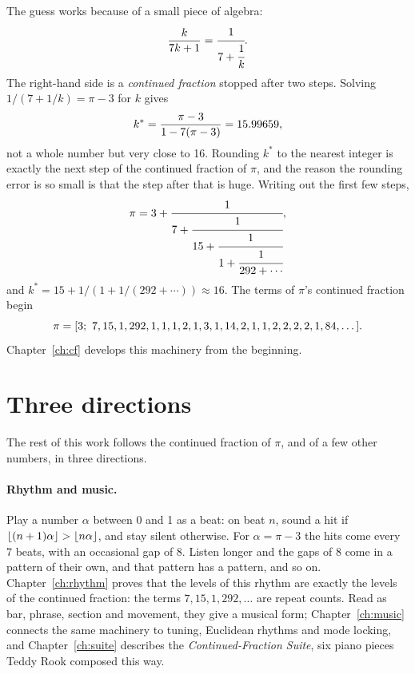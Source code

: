 The guess works because of a small piece of algebra:
\begin{equation}\label{eq:guess-cf}
  \frac{k}{7k+1} = \cfrac{1}{7 + \cfrac{1}{k}}.
\end{equation}
The right-hand side is a \emph{continued fraction} stopped after two steps. Solving $1/(7 + 1/k) = \pi - 3$ for $k$ gives
\[
  k^\ast = \frac{\pi - 3}{1 - 7(\pi-3)} = 15.99659,
\]
not a whole number but very close to 16. Rounding $k^\ast$ to the nearest integer is exactly the next step of the continued fraction of $\pi$, and the reason the rounding error is so small is that the step after that is huge. Writing out the first few steps,
\begin{equation}\label{eq:pi-cf}
  \pi = 3 + \cfrac{1}{7 + \cfrac{1}{15 + \cfrac{1}{1 + \cfrac{1}{292 + \cdots}}}},
\end{equation}
and $k^\ast = 15 + 1/(1 + 1/(292 + \cdots)) \approx 16$. The terms of $\pi$'s continued fraction begin
\[
  \pi = \cf{3;\ \PiTermsShown, \dots}.
\]
Chapter~\ref{ch:cf} develops this machinery from the beginning.

\section{Three directions}

The rest of this work follows the continued fraction of $\pi$, and of a few other numbers, in three directions.

\paragraph{Rhythm and music.} Play a number $\alpha$ between 0 and 1 as a beat: on beat $n$, sound a hit if $\left\lfloor (n+1)\alpha\right\rfloor > \left\lfloor n\alpha\right\rfloor$, and stay silent otherwise. For $\alpha = \pi - 3$ the hits come every 7 beats, with an occasional gap of 8. Listen longer and the gaps of 8 come in a pattern of their own, and that pattern has a pattern, and so on. Chapter~\ref{ch:rhythm} proves that the levels of this rhythm are exactly the levels of the continued fraction: the terms $7, 15, 1, 292, \dots$ are repeat counts. Read as bar, phrase, section and movement, they give a musical form; Chapter~\ref{ch:music} connects the same machinery to tuning, Euclidean rhythms and mode locking, and Chapter~\ref{ch:suite} describes the \emph{Continued-Fraction Suite}, six piano pieces Teddy Rook composed this way.

